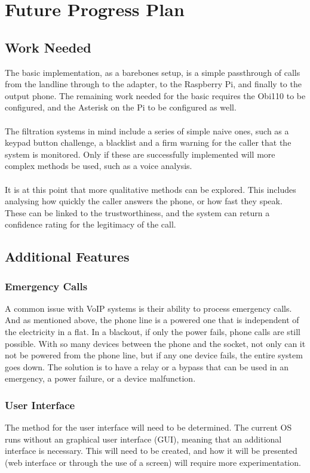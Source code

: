 \documentclass[12pt,a4paper]{report}
\begin{document}
\section{Future Progress Plan}
\subsection{Work Needed}
The basic implementation, as a barebones setup, is a simple passthrough of calls from the landline through to the adapter, to the Raspberry Pi, and finally to the output phone. The remaining work needed for the basic requires the Obi110 to be configured, and the Asterisk on the Pi to be configured as well.
\\\\
The filtration systems in mind include a series of simple naive ones, such as a keypad button challenge, a blacklist and a firm warning for the caller that the system is monitored. Only if these are successfully implemented will more complex methods be used, such as a voice analysis.
\\\\
It is at this point that more qualitative methods can be explored. This includes analysing how quickly the caller answers the phone, or how fast they speak. These can be linked to the trustworthiness, and the system can return a confidence rating for the legitimacy of the call.

\subsection{Additional Features}
\subsubsection{Emergency Calls}
A common issue with VoIP systems is their ability to process emergency calls. And as mentioned above, the phone line is a powered one that is independent of the electricity in a flat. In a blackout, if only the power fails, phone calls are still possible. With so many devices between the phone and the socket, not only can it not be powered from the phone line, but if any one device fails, the entire system goes down. The solution is to have a relay or a bypass that can be used in an emergency, a power failure, or a device malfunction.

\subsubsection{User Interface}
The method for the user interface will need to be determined. The current OS runs without an graphical user interface (GUI), meaning that an additional interface is necessary. This will need to be created, and how it will be presented (web interface or through the use of a screen) will require more experimentation.
\end{document}
